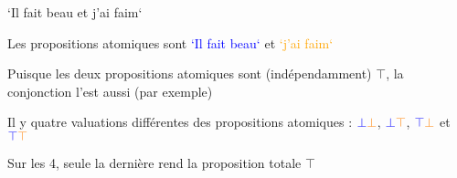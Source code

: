 \begin{frame}
	
	`Il fait beau et j'ai faim`\pause\newline
	
	Les propositions atomiques sont \textcolor{blue}{`Il fait beau`} et \textcolor{orange}{`j'ai faim`}\pause\newline
	
		\begin{description}[labelindent=6pt,style=multiline,leftmargin=1.3in]
		 \setlength\itemsep{1.4em}
		 
		 \item[Vérité] Puisque les deux propositions atomiques sont (indépendamment) $\top$, la conjonction l'est aussi (par exemple)
		 \pause
		 \item[Conditions de vérité] Il y quatre valuations différentes des propositions atomiques : \pause $\textcolor{blue}{\bot}\textcolor{orange}{\bot}$, $\textcolor{blue}{\bot}\textcolor{orange}{\top}$, $\textcolor{blue}{\top}\textcolor{orange}{\bot}$ et $\textcolor{blue}{\top}\textcolor{orange}{\top}$\pause
		 \item[] Sur les 4, seule la dernière rend la proposition totale $\top$
		 	\end{description}
\end{frame}




